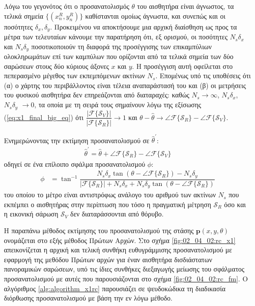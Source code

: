 Λόγω του γεγονότος ότι ο προσανατολισμός $\theta$ του αισθητήρα είναι άγνωστος,
τα τελικά σημεία $\{(x_n^R,y_n^R)\}$ καθίστανται ομοίως άγνωστα, και συνεπώς
και οι ποσότητες $\delta_x, \delta_y$. Προκειμένου να αποκτήσουμε μια αρχική
διαίσθηση ως προς τα μέτρα των τελευταίων κάνουμε την παρατήρηση ότι, εξ
ορισμού, οι ποσότητες $N_s \delta_x$ και $N_s \delta_y$ ποσοτικοποιούν τη
διαφορά της προσέγγισης των επικαμπύλιων ολοκληρωμάτων επί των καμπύλων που
ορίζονται από τα τελικά σημεία των δύο σαρώσεων στους δύο κύριους άξονες $x$
και $y$.  Η προσέγγιση αυτή οφείλεται στο πεπερασμένο μέγεθος των εκπεμπόμενων
ακτίνων $N_s$. Επομένως υπό τις υποθέσεις ότι (α) ο χάρτης του περιβάλλοντος
είναι τέλεια αναπαράστασή του και (β) οι μετρήσεις του φυσικού αισθητήρα δεν
επηρεάζονται από διαταραχές: καθώς $N_s \rightarrow \infty$, $N_s \delta_x$,
$N_s \delta_y$ $\rightarrow 0$, τα οποία με τη σειρά τους σημαίνουν λόγω της
εξίσωσης (\ref{eq:x1_final_big_eq}) ότι
$\dfrac{|\mathcal{F}\{\mathcal{S}_V\}|}{|\mathcal{F}\{\mathcal{S}_R\}|}
\rightarrow 1$ και $\theta-\hat{\theta} \rightarrow \angle
\mathcal{F}\{\mathcal{S}_R\} - \angle \mathcal{F}\{\mathcal{S}_V\}$.

\begin{gg_box}
\begin{remark}
  \label{remark:02_04_02:02}
  Ενημερώνοντας την εκτίμηση προσανατολισμού σε $\hat{\theta}^\prime$:
  \begin{align}
  \hat{\theta}^\prime = \hat{\theta} + \angle \mathcal{F}\{\mathcal{S}_R\} - \angle\mathcal{F}\{\mathcal{S}_V\}
    \label{eq:update_t2}
  \end{align}
  οδηγεί σε ένα επίλοιπο σφάλμα προσανατολισμού $\phi$:
  \begin{align}
    \phi &= \tan^{-1}\dfrac{N_s \delta_x \tan(\theta - \angle \mathcal{F}\{\mathcal{S}_R\}) - N_s \delta_y}{|\mathcal{F}\{\mathcal{S}_R\}| + N_s \delta_x + N_s \delta_y \tan(\theta - \angle \mathcal{F}\{\mathcal{S}_R\})} \label{eq:phi2}
  \end{align}
  του οποίου το μέτρο είναι αντιστρόφως ανάλογο του αριθμού των ακτίνων $N_s$ που
  εκπέμπει ο αισθητήρας στην περίπτωση που τόσο η πραγματική μέτρηση
  $\mathcal{S}_R$ όσο και η εικονική σάρωση $\mathcal{S}_V$ δεν διαταράσσονται
  από θόρυβο.
\end{remark}
\end{gg_box}

Η παραπάνω μέθοδος εκτίμησης του προσανατολισμού της στάσης
$\bm{p}(x,y,\theta)$ ονομάζεται στο εξής μέθοδος Πρώτων Αρχών.  Στο σχήμα
\ref{fig:02_04_02:rc_x1} απεικονίζεται η αρχική και τελική συνθήκη
ευθυγράμμισης προσανατολισμού με εφαρμογή της μεθόδου Πρώτων αρχών για έναν
αισθητήρα δισδιάστατων πανοραμικών σαρώσεων, υπό τις ίδιες συνθήκες διεξαγωγής
μείωσης του σφάλματος προσανατολισμού με αυτές που παρουσιάζονται στο σχήμα
\ref{fig:02_04_02:rc_fm}. Ο αλγόριθμος \ref{alg:algorithm_x1rc} παρουσιάζει σε
ψευδοκώδικα τη διαδικασία διόρθωσης προσανατολισμού με βάση την εν λόγω μέθοδο.

